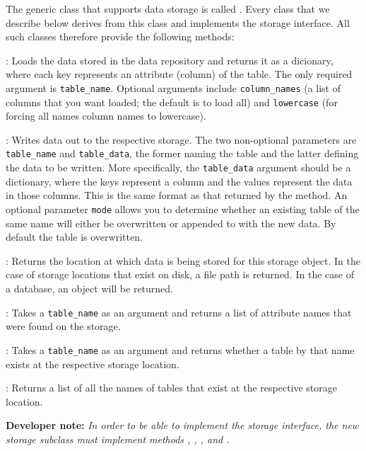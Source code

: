 {The generic class that supports data storage is called
. Every class that we describe below derives from this class and
implements the storage interface. All such classes therefore provide the
following methods:

{\bf {}}: Loads the data stored in the data repository and
returns it as a dicionary, where each key represents an attribute (column) of
the table. The only required argument is \verb|table_name|. Optional
arguments include \verb|column_names| (a list of columns that you want loaded;
the default is to load all) and \verb|lowercase| (for forcing all names column
names to lowercase). 

{\bf {}}: Writes data out to the respective storage. The
two non-optional parameters are \verb|table_name| and \verb|table_data|, the
former naming the table and the latter defining the data to be written. More
specifically, the \verb|table_data| argument should be a dictionary, where
the keys represent a column and the values represent the data in those columns. 
This is the same format as that returned by the  method.
An optional parameter \verb|mode| allows you to determine whether an existing
table of the same name will either be overwritten or appended to with the new
data. By default the table is overwritten. 

{\bf {}}: Returns the location at which data is
being stored for this storage object. In the case of storage locations that
exist on disk, a file path is returned. In the case of a database, an
 object will be returned. 

{\bf {}}: Takes a \verb|table_name| as an
argument and returns a list of attribute names that were found on the storage.

{\bf {}}: Takes a \verb|table_name| as an
argument and returns whether a table by that name exists at the respective
storage location.

{\bf {}}: Returns a list of all the names of tables
that exist at the respective storage location.

{\bf Developer note:} \textit{In order to be able to implement the storage
interface, the new storage subclass must implement methods ,
, ,
and .}

}

